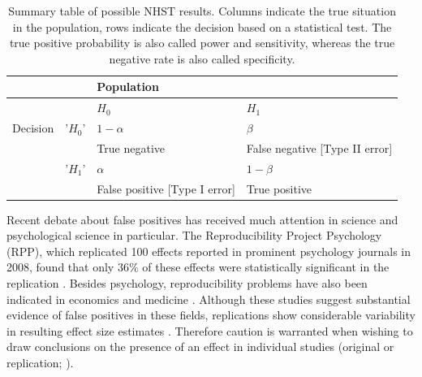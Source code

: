 \documentclass{article}
\begin{document}
\begin{table}[htbp]
\caption{Summary table of possible NHST results. Columns indicate the true situation in the population, rows indicate the decision based on a statistical test. The true positive probability is also called power and sensitivity, whereas the true negative rate is also called specificity.}
\begin{adjustbox}{width=\textwidth,totalheight=\textheight,keepaspectratio,angle=0}
\centering
\begin{tabular}{llll}
&    & Population                        &                                    \\ \hline
&    & $H_0$                                & $H_1$                                 \\
Decision & '$H_0$' & $1-\alpha$                           & $\beta$                               \\
&    & True negative                     & False negative {[}Type II error{]} \\
& '$H_1$' & $\alpha$                             & $1-\beta$                             \\
&    & False positive {[}Type I error{]} & True positive                   \\  \hline
\end{tabular}
\end{adjustbox}
\label{tab:tab1}
\end{table}

Recent debate about false positives has received much attention in science and psychological science in particular. The Reproducibility Project Psychology (RPP), which replicated 100 effects reported in prominent psychology journals in 2008, found that only 36\% of these effects were statistically significant in the replication \cite{Open_Science_Collaboration2015-zs}. Besides psychology, reproducibility problems have also been indicated in economics \cite{Camerer2016-zz} and medicine \cite{Begley2012-uc}. Although these studies suggest substantial evidence of false positives in these fields, replications show considerable variability in resulting effect size estimates \cite{Klein2014-jb, Stanley2014-pd}. Therefore caution is warranted when wishing to draw conclusions on the presence of an effect in individual studies (original or replication; \cite{Open_Science_Collaboration2015-zs,Gilbert2016-mi,Anderson2016-bv}).
\end{document}
